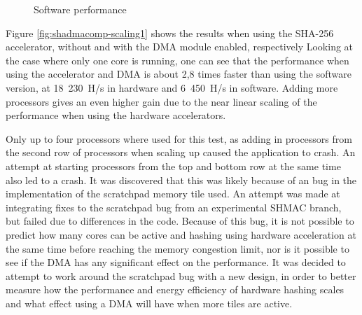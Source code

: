 \begin{figure}
	\centering
	\caption{Software performance}
	\label{fig:sw-scaling1}
\end{figure}

Figure \ref{fig:shadmacomp-scaling1} shows the results when using the SHA-256 accelerator, without and with the DMA module enabled, respectively
Looking at the case where only one core is running, one can see that the performance when using the accelerator and DMA is about 2,8 times faster than
using the software version, at 18~230~H/s in hardware and 6~450~H/s in software. Adding more processors gives an even higher gain due to the
near linear scaling of the performance when using the hardware accelerators.

Only up to four processors where used for this test, as adding in processors from the second row of processors when scaling up caused the application to crash.
An attempt at starting processors from the top and bottom row at the same time also led to a crash.
It was discovered that this was likely because of an bug in the implementation of the scratchpad memory tile used. An attempt was made at integrating fixes
to the scratchpad bug from an experimental SHMAC branch, but failed due to differences in the code. Because of this bug, it is not
possible to predict how many cores can be active and hashing using hardware acceleration at the same time before reaching the memory congestion limit,
nor is it possible to see if the DMA has any significant effect on the performance. It was decided to attempt to work around the scratchpad bug with
a new design, in order to better measure how the performance and energy efficiency of hardware hashing scales and what effect using a DMA will have when more tiles are active.

